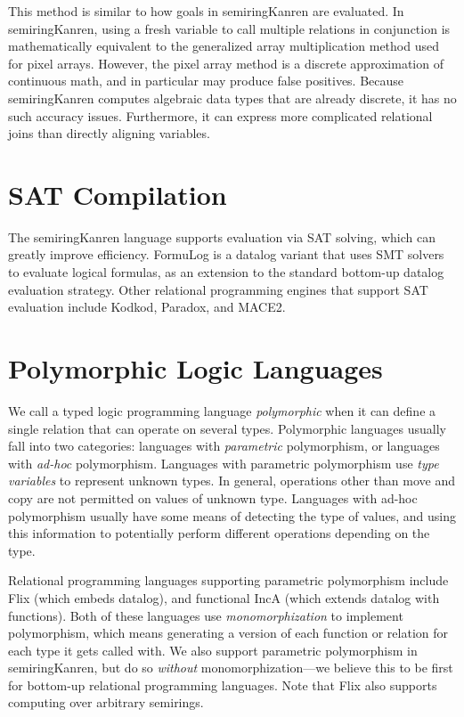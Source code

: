 \documentclass{report}
\theoremstyle{definition}
\begin{document}
This method is similar to how goals in semiringKanren are evaluated.
In semiringKanren, using a fresh variable to call multiple relations in conjunction is mathematically equivalent to the generalized array multiplication method used for pixel arrays.
However, the pixel array method is a discrete approximation of continuous math, and in particular may produce false positives.
Because semiringKanren computes algebraic data types that are already discrete, it has no such accuracy issues.
Furthermore, it can express more complicated relational joins than directly aligning variables.

\section{SAT Compilation}

The semiringKanren language supports evaluation via SAT solving, which can greatly improve efficiency\cite{volkov2025}.
FormuLog\cite{bembenek2018} is a datalog variant that uses SMT solvers to evaluate logical formulas, as an extension to the standard bottom-up datalog evaluation strategy.
Other relational programming engines that support SAT evaluation include Kodkod\cite{torlak2007}, Paradox, and MACE2.

\section{Polymorphic Logic Languages}

We call a typed logic programming language \emph{polymorphic} when it can define a single relation that can operate on several types.
Polymorphic languages usually fall into two categories: languages with \emph{parametric} polymorphism, or languages with \emph{ad-hoc} polymorphism.
Languages with parametric polymorphism use \emph{type variables} to represent unknown types.
In general, operations other than move and copy are not permitted on values of unknown type.
Languages with ad-hoc polymorphism usually have some means of detecting the type of values, and using this information to potentially perform different operations depending on the type.

Relational programming languages supporting parametric polymorphism include Flix\cite{madsen2020} (which embeds datalog), and functional IncA\cite{pacak2022} (which extends datalog with functions).
Both of these languages use \emph{monomorphization} to implement polymorphism,
which means generating a version of each function or relation for each type it gets called with.
We also support parametric polymorphism in semiringKanren, but do so \emph{without} monomorphization---we believe this to be first for bottom-up relational programming languages.
Note that Flix also supports computing over arbitrary semirings.
\end{document}
